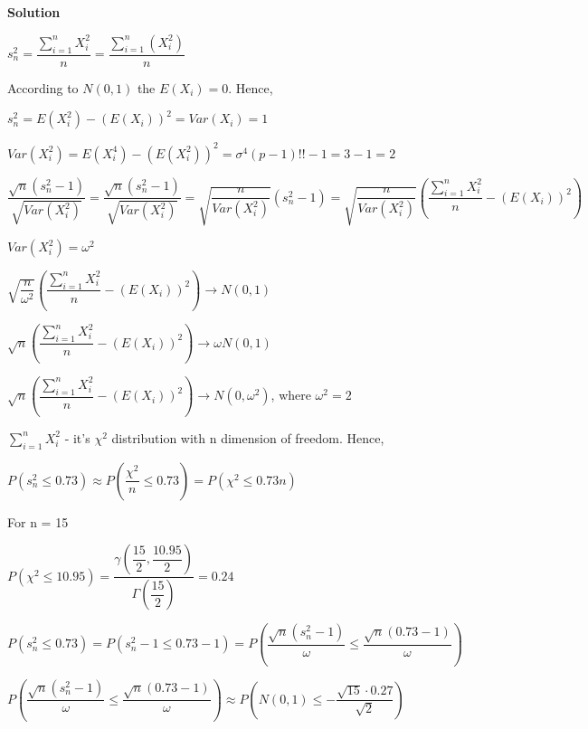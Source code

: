 \documentclass[12pt]{article}
\begin{document}
\textbf{Solution}
\begin{list}{()~}{}
\item $s_n^2 = \dfrac{\sum_{i = 1}^n X_i^2}{n}=\dfrac{\sum_{i = 1}^n\left(X_i^2\right)}{n}$

According to $N\left(0, 1\right)$ the $E\left(X_i\right)=0$. Hence, 

$s_n^2=E\left(X_i^2\right)-\left(E\left(X_i\right)\right)^2 = Var\left(X_i\right) = 1$

\item $Var\left(X_i^2\right) = E\left(X_i^4\right)-\left(E\left(X_i^2\right)\right)^2=\sigma^4\left(p-1\right)!!-1=3-1=2$

$\dfrac{\sqrt{n}\left(s_n^2-1\right)}{\sqrt{Var\left(X_i^2\right)}}=\dfrac{\sqrt{n}\left(s_n^2 - 1\right)}{\sqrt{Var\left(X_i^2\right)}} = \sqrt{\dfrac{n}{Var\left(X_i^2\right)}}\left(s_n^2-1\right) = \sqrt{\dfrac{n}{Var\left(X_i^2\right)}} \left(\dfrac{\sum_{i = 1}^n X_i^2}{n} - \left(E\left(X_i\right)\right)^2\right)$

$Var\left(X_i^2\right) = \omega^2$

$\sqrt{\dfrac{n}{\omega^2}} \left(\dfrac{\sum_{i = 1}^n X_i^2}{n} - \left(E\left(X_i\right)\right)^2\right)\rightarrow N\left(0,1\right)$

$\sqrt{n} \left(\dfrac{\sum_{i = 1}^n X_i^2}{n} - \left(E\left(X_i\right)\right)^2\right)\rightarrow \omega N\left(0,1\right)$

$\sqrt{n} \left(\dfrac{\sum_{i = 1}^n X_i^2}{n} - \left(E\left(X_i\right)\right)^2\right)\rightarrow  N\left(0,\omega^2\right)$, where $\omega^2=2$


\item $\sum_{i = 1}^{n}X_i^2$ - it's $\chi^2$ distribution with n dimension of freedom. Hence, 

$P\left(s_n^2\leq 0.73\right)\approx P\left(\dfrac{\chi^2}{n}\leq 0.73\right)=P\left(\chi^2\leq 0.73n\right)$

For n = 15

$P\left(\chi^2\leq 10.95\right)=\dfrac{\gamma\left(\dfrac{15}{2}, \dfrac{10.95}{2}\right)}{\Gamma\left(\dfrac{15}{2}\right)}=0.24$

\item $P\left(s_n^2\leq 0.73\right) = P\left(s_n^2-1\leq 0.73-1\right) = P\left(\dfrac{\sqrt{n}\left(s_n^2-1\right)}{\omega}\leq \dfrac{\sqrt{n}\left(0.73-1\right)}{\omega}\right)$

$P\left(\dfrac{\sqrt{n}\left(s_n^2-1\right)}{\omega}\leq \dfrac{\sqrt{n}\left(0.73-1\right)}{\omega}\right)\approx P\left(N\left(0, 1\right)\leq -\dfrac{\sqrt{15}\cdot 0.27}{\sqrt{2}}\right)$


\end{list}
\end{document}
